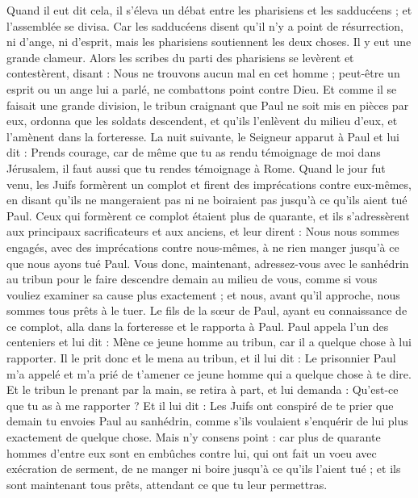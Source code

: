 \begin{multicols}{2}
Quand il eut dit cela, il s’éleva un débat entre les pharisiens et les sadducéens ; et l'assemblée se divisa.
Car les sadducéens disent qu'il n'y a point de résurrection, ni d'ange, ni d'esprit, mais les pharisiens soutiennent les deux choses.
Il y eut une grande clameur. Alors les scribes du parti des pharisiens se levèrent et contestèrent, disant : Nous ne trouvons aucun mal en cet homme ; peut-être un esprit ou un ange lui a parlé, ne combattons point contre Dieu.
Et comme il se faisait une grande division, le tribun craignant que Paul ne soit mis en pièces par eux, ordonna que les soldats descendent, et qu'ils l'enlèvent du milieu d'eux, et l'amènent dans la forteresse.
La nuit suivante, le Seigneur apparut à Paul et lui dit : Prends courage, car de même que tu as rendu témoignage de moi dans Jérusalem, il faut aussi que tu rendes témoignage à Rome.
Quand le jour fut venu, les Juifs formèrent un complot et firent des imprécations contre eux-mêmes, en disant qu'ils ne mangeraient pas ni ne boiraient pas jusqu'à ce qu'ils aient tué Paul.
Ceux qui formèrent ce complot étaient plus de quarante,
et ils s'adressèrent aux principaux sacrificateurs et aux anciens, et leur dirent : Nous nous sommes engagés, avec des imprécations contre nous-mêmes, à ne rien manger jusqu’à ce que nous ayons tué Paul.
Vous donc, maintenant, adressez-vous avec le sanhédrin au tribun pour le faire descendre demain au milieu de vous, comme si vous vouliez examiner sa cause plus exactement ; et nous, avant qu'il approche, nous sommes tous prêts à le tuer.
Le fils de la sœur de Paul, ayant eu connaissance de ce complot, alla dans la forteresse et le rapporta à Paul.
Paul appela l’un des centeniers et lui dit : Mène ce jeune homme au tribun, car il a quelque chose à lui rapporter.
Il le prit donc et le mena au tribun, et il lui dit : Le prisonnier Paul m'a appelé et m'a prié de t'amener ce jeune homme qui a quelque chose à te dire.
Et le tribun le prenant par la main, se retira à part, et lui demanda : Qu'est-ce que tu as à me rapporter ?
Et il lui dit : Les Juifs ont conspiré de te prier que demain tu envoies Paul au sanhédrin, comme s'ils voulaient s'enquérir de lui plus exactement de quelque chose.
 Mais n'y consens point : car plus de quarante hommes d'entre eux sont en embûches contre lui, qui ont fait un voeu avec exécration de serment, de ne manger ni boire jusqu'à ce qu'ils l'aient tué ; et ils sont maintenant tous prêts, attendant ce que tu leur permettras.

\end{multicols}
